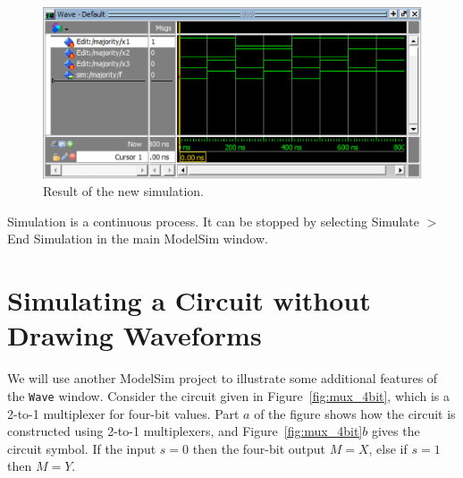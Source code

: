 \documentclass[11pt, twoside, pdftex]{article}
\begin{document}
\begin{figure}[H]
   \begin{center}
      \includegraphics[scale=.75]{figures/figure30.png}
   \caption{Result of the new simulation.} 
	 \label{fig:30}
	 \end{center}
\end{figure}

\noindent
Simulation is a continuous process. It can be stopped by selecting 
{\sf Simulate $>$ End Simulation} in the main ModelSim window.

\section{Simulating a Circuit without Drawing Waveforms}

We will use another ModelSim project to illustrate some additional features
of the \texttt{Wave} window.  Consider the circuit given in Figure~\ref{fig:mux_4bit}, 
which is a 2-to-1 multiplexer for four-bit values. Part $a$ of the figure shows how the
circuit is constructed using 2-to-1 multiplexers, and Figure~\ref{fig:mux_4bit}$b$ gives 
the circuit symbol.  If the input $s = 0$ then the four-bit output $M = X$, 
else if $s = 1$ then $M = Y$. 
\end{document}
